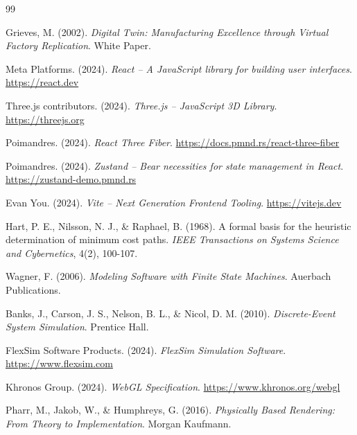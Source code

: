 \documentclass[12pt,a4paper]{report}
\begin{document}
\begin{thebibliography}{99}

 Grieves, M. (2002). \textit{Digital Twin: Manufacturing Excellence through Virtual Factory Replication}. White Paper.

 Meta Platforms. (2024). \textit{React -- A JavaScript library for building user interfaces}. \url{https://react.dev}

 Three.js contributors. (2024). \textit{Three.js -- JavaScript 3D Library}. \url{https://threejs.org}

 Poimandres. (2024). \textit{React Three Fiber}. \url{https://docs.pmnd.rs/react-three-fiber}

 Poimandres. (2024). \textit{Zustand -- Bear necessities for state management in React}. \url{https://zustand-demo.pmnd.rs}

 Evan You. (2024). \textit{Vite -- Next Generation Frontend Tooling}. \url{https://vitejs.dev}

 Hart, P. E., Nilsson, N. J., \& Raphael, B. (1968). A formal basis for the heuristic determination of minimum cost paths. \textit{IEEE Transactions on Systems Science and Cybernetics}, 4(2), 100-107.

 Wagner, F. (2006). \textit{Modeling Software with Finite State Machines}. Auerbach Publications.

 Banks, J., Carson, J. S., Nelson, B. L., \& Nicol, D. M. (2010). \textit{Discrete-Event System Simulation}. Prentice Hall.

 FlexSim Software Products. (2024). \textit{FlexSim Simulation Software}. \url{https://www.flexsim.com}

 Khronos Group. (2024). \textit{WebGL Specification}. \url{https://www.khronos.org/webgl}

 Pharr, M., Jakob, W., \& Humphreys, G. (2016). \textit{Physically Based Rendering: From Theory to Implementation}. Morgan Kaufmann.

\end{thebibliography}
\end{document}

